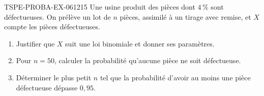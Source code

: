 \begin{exercice}{TSPE-PROBA-EX-061}{2}{15}
Une usine produit des pièces dont $4\,\%$ sont défectueuses. On prélève un lot
de $n$ pièces, assimilé à un tirage avec remise, et $X$ compte les pièces
défectueuses.
\begin{enumerate}
  \item Justifier que $X$ suit une loi binomiale et donner ses paramètres.
  \item Pour $n=50$, calculer la probabilité qu'aucune pièce ne soit
        défectueuse.
  \item Déterminer le plus petit $n$ tel que la probabilité d'avoir au moins
        une pièce défectueuse dépasse $0{,}95$.
\end{enumerate}
\end{exercice}
